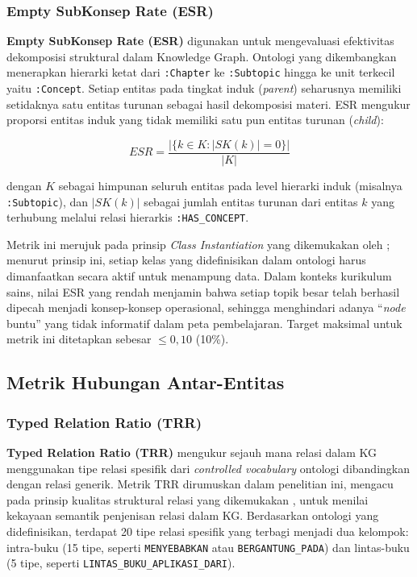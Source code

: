 \documentclass[../../thesis]{subfiles}
\begin{document}
\subsubsection{Empty SubKonsep Rate (ESR)}

\textbf{Empty SubKonsep Rate (ESR)} digunakan untuk mengevaluasi
efektivitas dekomposisi struktural dalam Knowledge Graph. Ontologi yang
dikembangkan menerapkan hierarki ketat dari \texttt{:Chapter} ke
\texttt{:Subtopic} hingga ke unit terkecil yaitu \texttt{:Concept}.
Setiap entitas pada tingkat induk (\textit{parent}) seharusnya memiliki
setidaknya satu entitas turunan sebagai hasil dekomposisi materi. ESR
mengukur proporsi entitas induk yang tidak memiliki satu pun entitas
turunan (\textit{child}):

\[
  ESR = \frac{\bigl|\{ k \in K : |SK(k)| = 0 \}\bigr|}{|K|}
\]

\noindent dengan $K$ sebagai himpunan seluruh entitas pada level hierarki
induk (misalnya \texttt{:Subtopic}), dan $|SK(k)|$ sebagai jumlah entitas
turunan dari entitas $k$ yang terhubung melalui relasi hierarkis
\texttt{:HAS\_CONCEPT}.

Metrik ini merujuk pada prinsip \textit{Class Instantiation} yang
dikemukakan oleh \textcite{seo_structural_2022}; menurut prinsip ini, setiap kelas yang
didefinisikan dalam ontologi harus dimanfaatkan secara aktif untuk
menampung data. Dalam konteks kurikulum sains, nilai ESR yang rendah
menjamin bahwa setiap topik besar telah berhasil dipecah menjadi
konsep-konsep operasional, sehingga menghindari adanya ``\textit{node} buntu''
yang tidak informatif dalam peta pembelajaran. Target maksimal untuk
metrik ini ditetapkan sebesar $\leq 0{,}10$ (10\%).

\subsection{Metrik Hubungan Antar-Entitas}
\label{subsec:metrik-hubungan}

\subsubsection{Typed Relation Ratio (TRR)}

\textbf{Typed Relation Ratio (TRR)} mengukur sejauh mana relasi dalam KG
menggunakan tipe relasi spesifik dari \textit{controlled vocabulary}
ontologi dibandingkan dengan relasi generik. Metrik TRR dirumuskan dalam
penelitian ini, mengacu pada prinsip kualitas struktural relasi yang
dikemukakan \textcite{seo_structural_2022}, untuk menilai kekayaan semantik
penjenisan relasi dalam KG. Berdasarkan ontologi yang
didefinisikan, terdapat 20 tipe relasi spesifik yang terbagi menjadi dua
kelompok: intra-buku (15 tipe, seperti \texttt{MENYEBABKAN} atau
\texttt{BERGANTUNG\_PADA}) dan lintas-buku (5 tipe, seperti
\texttt{LINTAS\_BUKU\_APLIKASI\_DARI}).
\end{document}
